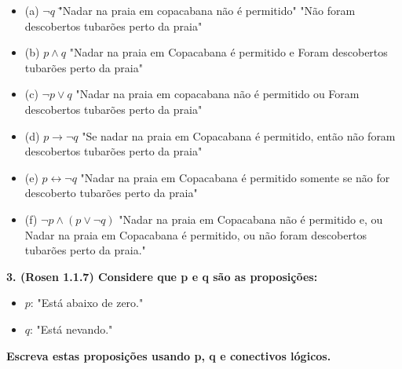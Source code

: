 \documentclass{article}
\begin{document}
    \begin{itemize}[label={}]
       \item(a) $\neg  q$ \quad \= "Nadar na praia em copacabana não é permitido" "Não foram descobertos tubarões perto da praia" \\
       
       \item(b) $p \wedge q$ \> "Nadar na praia em Copacabana é permitido e Foram descobertos tubarões perto da praia" \\
       
       \item(c) $\neg p \vee q$ \> "Nadar na praia em copacabana não é permitido ou Foram descobertos tubarões perto da praia" \\
       
       \item(d) $p \rightarrow \neg q$ \> "Se nadar na praia em Copacabana é permitido, então não foram descobertos tubarões perto da praia" \\
       
       \item(e) $p \leftrightarrow \neg q$ \> "Nadar na praia em Copacabana é permitido somente se não for descoberto tubarões perto da praia" \\
       
       \item(f) $\neg p \wedge (p \vee \neg q)$ \> "Nadar na praia em Copacabana não é permitido e, ou Nadar na praia em Copacabana é permitido, ou não foram descobertos tubarões perto da praia." \\
    \end{itemize}
    
\vspace{1cm}

\textbf{3. (Rosen 1.1.7) Considere que p e q são as proposições:}

   \begin{itemize}[label={}]
    \item \( p \): "Está abaixo de zero."
    \item \( q \): "Está nevando."
\end{itemize}

\textbf{Escreva estas proposições usando p, q e conectivos lógicos.}
\end{document}
